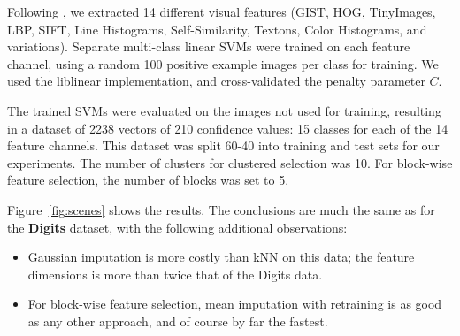 Following \cite{Xiao-CVPR-2010}, we extracted 14 different visual features (GIST, HOG, TinyImages, LBP, SIFT, Line Histograms, Self-Similarity, Textons, Color Histograms, and variations).
Separate multi-class linear SVMs were trained on each feature channel, using a random 100 positive example images per class for training.
We used the liblinear implementation, and cross-validated the penalty parameter $C$.

The trained SVMs were evaluated on the images not used for training, resulting in a dataset of 2238 vectors of 210 confidence values: 15 classes for each of the 14 feature channels.
This dataset was split 60-40 into training and test sets for our experiments.
The number of clusters for clustered selection was 10.
For block-wise feature selection, the number of blocks was set to 5.

Figure~\ref{fig:scenes} shows the results.
The conclusions are much the same as for the \textbf{Digits} dataset, with the following additional observations:
\begin{itemize}
\item Gaussian imputation is more costly than kNN on this data; the feature dimensions is more than twice that of the Digits data.
\item For block-wise feature selection, mean imputation with retraining is as good as any other approach, and of course by far the fastest.
\end{itemize}

